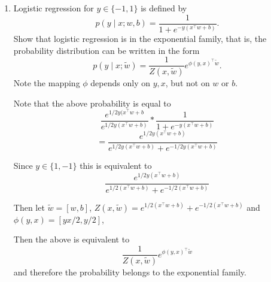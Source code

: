\documentclass{article}
\begin{document}
\begin{enumerate}
\item
Logistic regression for $y\in \{-1,1\}$ is defined by
$$p(y \mid x; w,b) = \frac{1}{1+e^{-y (x^\top w + b)}}.$$
Show that logistic regression is in the exponential family, that is, the probability distribution can be written in the form
$$p(y \mid x; \tilde w) = \frac{1}{Z(x,\tilde w)} e^{\phi(y,x)^\top \tilde w}.$$
Note the mapping $\phi$ depends only on $y, x$, but not on $w$ or $b$.

\color{blue}
Note that the above probability is equal to 
$$
\frac{e^{1/2 y(x^\top w + b}}{e^{1/2 y(x^\top w + b)}} * \frac{1}{1+e^{-y (x^\top w + b)}}
$$
$$
= \frac{e^{1/2 y(x^\top w + b)}}{e^{1/2 y(x^\top w + b)} +e^{-1/2 y(x^\top w + b)} }
$$

Since $y \in \{1, -1\}$ this is equivalent to 
$$
\frac{e^{1/2 y(x^\top w + b)}}{e^{1/2(x^\top w + b)} +e^{-1/2(x^\top w + b)} }
$$

Then let $\tilde w = [w,b]$, $Z(x,\tilde w) = e^{1/2(x^\top w + b)} +e^{-1/2(x^\top w + b)}$ and $\phi(y,x) = [yx/2, y/2]$,

Then the above is equivalent to 
$$
\frac{1}{Z(x,\tilde w)} e^{\phi(y,x)^\top \tilde w}
$$
and therefore the probability belongs to the exponential family.

\color{black}

\end{enumerate}
\end{document}
